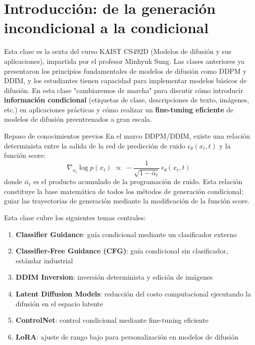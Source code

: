 \section{Introducción: de la generación incondicional a la condicional}

Esta clase es la sexta del curso KAIST CS492D (Modelos de difusión y sus aplicaciones), impartida por el profesor Minhyuk Sung. Las clases anteriores ya presentaron los principios fundamentales de modelos de difusión como DDPM y DDIM, y los estudiantes tienen capacidad para implementar modelos básicos de difusión. En esta clase "cambiaremos de marcha" para discutir cómo introducir \textbf{información condicional} (etiquetas de clase, descripciones de texto, imágenes, etc.) en aplicaciones prácticas y cómo realizar un \textbf{fine-tuning eficiente} de modelos de difusión preentrenados a gran escala.

\begin{knowledgebox}{Repaso de conocimientos previos}
En el marco DDPM/DDIM, existe una relación determinista entre la salida de la red de predicción de ruido $\epsilon_\theta(x_t, t)$ y la función score:
$$
\nabla_{x_t} \log p(x_t) \;\propto\; -\frac{1}{\sqrt{1-\bar\alpha_t}}\,\epsilon_\theta(x_t, t)
$$
donde $\bar\alpha_t$ es el producto acumulado de la programación de ruido. Esta relación constituye la base matemática de todos los métodos de generación condicional: guiar las trayectorias de generación mediante la modificación de la función score.
\end{knowledgebox}

Esta clase cubre los siguientes temas centrales:
\begin{enumerate}
    \item \textbf{Classifier Guidance}: guía condicional mediante un clasificador externo
    \item \textbf{Classifier-Free Guidance (CFG)}: guía condicional sin clasificador, estándar industrial
    \item \textbf{DDIM Inversion}: inversión determinista y edición de imágenes
    \item \textbf{Latent Diffusion Models}: reducción del costo computacional ejecutando la difusión en el espacio latente
    \item \textbf{ControlNet}: control condicional mediante fine-tuning eficiente
    \item \textbf{LoRA}: ajuste de rango bajo para personalización en modelos de difusión
\end{enumerate}

\newpage

